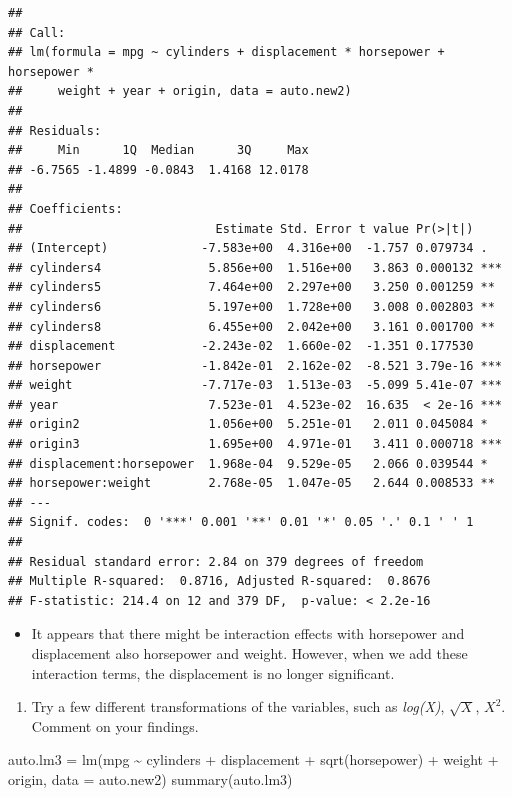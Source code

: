 \documentclass[
]{article}
\newenvironment{Shaded}{\begin{snugshade}}{\end{snugshade}}
\newcommand{\AttributeTok}[1]{\textcolor[rgb]{0.77,0.63,0.00}{#1}}
\newcommand{\FunctionTok}[1]{\textcolor[rgb]{0.00,0.00,0.00}{#1}}
\newcommand{\NormalTok}[1]{#1}
\newcommand{\OtherTok}[1]{\textcolor[rgb]{0.56,0.35,0.01}{#1}}
\newcommand{\SpecialCharTok}[1]{\textcolor[rgb]{0.00,0.00,0.00}{#1}}
\providecommand{\tightlist}{%
  \setlength{\itemsep}{0pt}\setlength{\parskip}{0pt}}
\begin{document}
\begin{verbatim}
## 
## Call:
## lm(formula = mpg ~ cylinders + displacement * horsepower + horsepower * 
##     weight + year + origin, data = auto.new2)
## 
## Residuals:
##     Min      1Q  Median      3Q     Max 
## -6.7565 -1.4899 -0.0843  1.4168 12.0178 
## 
## Coefficients:
##                           Estimate Std. Error t value Pr(>|t|)    
## (Intercept)             -7.583e+00  4.316e+00  -1.757 0.079734 .  
## cylinders4               5.856e+00  1.516e+00   3.863 0.000132 ***
## cylinders5               7.464e+00  2.297e+00   3.250 0.001259 ** 
## cylinders6               5.197e+00  1.728e+00   3.008 0.002803 ** 
## cylinders8               6.455e+00  2.042e+00   3.161 0.001700 ** 
## displacement            -2.243e-02  1.660e-02  -1.351 0.177530    
## horsepower              -1.842e-01  2.162e-02  -8.521 3.79e-16 ***
## weight                  -7.717e-03  1.513e-03  -5.099 5.41e-07 ***
## year                     7.523e-01  4.523e-02  16.635  < 2e-16 ***
## origin2                  1.056e+00  5.251e-01   2.011 0.045084 *  
## origin3                  1.695e+00  4.971e-01   3.411 0.000718 ***
## displacement:horsepower  1.968e-04  9.529e-05   2.066 0.039544 *  
## horsepower:weight        2.768e-05  1.047e-05   2.644 0.008533 ** 
## ---
## Signif. codes:  0 '***' 0.001 '**' 0.01 '*' 0.05 '.' 0.1 ' ' 1
## 
## Residual standard error: 2.84 on 379 degrees of freedom
## Multiple R-squared:  0.8716, Adjusted R-squared:  0.8676 
## F-statistic: 214.4 on 12 and 379 DF,  p-value: < 2.2e-16
\end{verbatim}

\begin{itemize}
\tightlist
\item
  It appears that there might be interaction effects with horsepower and
  displacement also horsepower and weight. However, when we add these
  interaction terms, the displacement is no longer significant.
\end{itemize}

\begin{enumerate}
\def\labelenumi{(\alph{enumi})}
\setcounter{enumi}{5}
\tightlist
\item
  Try a few different transformations of the variables, such as
  \emph{log(X)}, \(\sqrt{X}\), \(X^2\). Comment on your findings.
\end{enumerate}

\begin{Shaded}
\begin{Highlighting}[]
\NormalTok{auto.lm3 }\OtherTok{=} \FunctionTok{lm}\NormalTok{(mpg }\SpecialCharTok{\textasciitilde{}}\NormalTok{ cylinders }\SpecialCharTok{+}\NormalTok{ displacement }\SpecialCharTok{+} \FunctionTok{sqrt}\NormalTok{(horsepower) }\SpecialCharTok{+}\NormalTok{ weight }\SpecialCharTok{+}\NormalTok{ origin, }\AttributeTok{data =}\NormalTok{ auto.new2)}
\FunctionTok{summary}\NormalTok{(auto.lm3)}
\end{Highlighting}
\end{Shaded}
\end{document}
